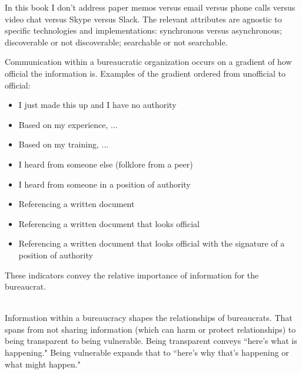 
In this book I don't address paper memos versus email versus phone calls versus video chat versus Skype versus Slack. 
The relevant attributes are agnostic to specific technologies and implementations: synchronous versus asynchronous; discoverable or not discoverable; searchable or not searchable. 


Communication within a bureaucratic organization occurs on a gradient of how official the information is. Examples of the gradient ordered from unofficial to official:
\begin{itemize}
    \item I just made this up and I have no authority
    \item Based on my experience, ...
    \item Based on my training, ...
    \item I heard from someone else (folklore from a peer)
    \item I heard from someone in a position of authority
    \item Referencing a written document
    \item Referencing a written document that looks official
    \item Referencing a written document that looks official with the signature of a position of authority
\end{itemize}
These indicators convey the relative importance of information for the bureaucrat. 

\ \\

Information within a bureaucracy shapes the relationships of bureaucrats. That spans from not sharing information (which can harm or protect relationships) to being transparent to being vulnerable.  
Being transparent conveys ``here's what is happening." Being vulnerable expands that to ``here's why that's happening or what might happen."
